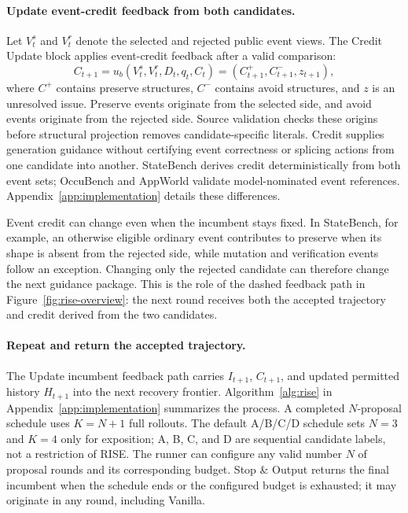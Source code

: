 \documentclass{article}
\begin{document}
\paragraph{Update event-credit feedback from both candidates.}
Let $V_t^s$ and $V_t^r$ denote the selected and rejected public event views. The Credit Update block applies event-credit feedback after a valid comparison:
\begin{equation}
C_{t+1}=u_b(V_t^s,V_t^r,D_t,q_t,C_t)
       =(C_{t+1}^{+},C_{t+1}^{-},z_{t+1}),
\label{eq:credit}
\end{equation}
where $C^+$ contains preserve structures, $C^-$ contains avoid structures, and $z$ is an unresolved issue. Preserve events originate from the selected side, and avoid events originate from the rejected side. Source validation checks these origins before structural projection removes candidate-specific literals. Credit supplies generation guidance without certifying event correctness or splicing actions from one candidate into another. StateBench derives credit deterministically from both event sets; OccuBench and AppWorld validate model-nominated event references. Appendix~\ref{app:implementation} details these differences.

Event credit can change even when the incumbent stays fixed. In StateBench, for example, an otherwise eligible ordinary event contributes to preserve when its shape is absent from the rejected side, while mutation and verification events follow an exception. Changing only the rejected candidate can therefore change the next guidance package. This is the role of the dashed feedback path in Figure~\ref{fig:rise-overview}: the next round receives both the accepted trajectory and credit derived from the two candidates.

\paragraph{Repeat and return the accepted trajectory.}
The Update incumbent feedback path carries $I_{t+1}$, $C_{t+1}$, and updated permitted history $H_{t+1}$ into the next recovery frontier. Algorithm~\ref{alg:rise} in Appendix~\ref{app:implementation} summarizes the process. A completed $N$-proposal schedule uses $K=N+1$ full rollouts. The default A/B/C/D schedule sets $N=3$ and $K=4$ only for exposition; A, B, C, and D are sequential candidate labels, not a restriction of RISE. The runner can configure any valid number $N$ of proposal rounds and its corresponding budget. Stop \& Output returns the final incumbent when the schedule ends or the configured budget is exhausted; it may originate in any round, including Vanilla.
\end{document}
